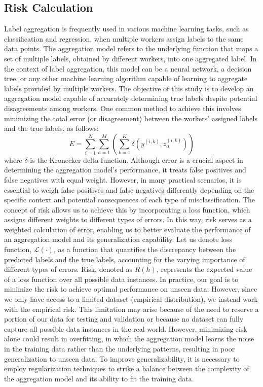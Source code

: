 \subsection{Risk Calculation}
Label aggregation is frequently used in various machine learning tasks, such as classification and regression, when multiple workers assign labels to the same data points. The aggregation model refers to the underlying function that maps a set of multiple labels, obtained by different workers, into one aggregated label. In the context of label aggregation, this model can be a neural network, a decision tree, or any other machine learning algorithm capable of learning to aggregate labels provided by multiple workers. The objective of this study is to develop an aggregation model capable of accurately determining true labels despite potential disagreements among workers. One common method to achieve this involves minimizing the total error (or disagreement) between the workers' assigned labels and the true labels, as follows:
\begin{equation}
E = \sum_{i=1}^N \sum_{a=1}^M \left( \sum_{k=1}^K \delta\left(y^{(i,k)}, z_\alpha^{(i,k)}\right) \right)
\label{eq:crowd.Eq.1.risk.error}
\end{equation}
where $\delta $ is the Kronecker delta function.
Although error is a crucial aspect in determining the aggregation model's performance, it treats false positives and false negatives with equal weight. However, in many practical scenarios, it is essential to weigh false positives and false negatives differently depending on the specific context and potential consequences of each type of misclassification. The concept of risk allows us to achieve this by incorporating a loss function, which assigns different weights to different types of errors. In this way, risk serves as a weighted calculation of error, enabling us to better evaluate the performance of an aggregation model and its generalization capability.
Let us denote loss function, $\mathcal{L}(\cdot)$, as a function that quantifies the discrepancy between the predicted labels and the true labels, accounting for the varying importance of different types of errors.
Risk, denoted as $R(h) $, represents the expected value of a loss function over all possible data instances.  In practice, our goal is to minimize the risk to achieve optimal performance on unseen data. However, since we only have access to a limited dataset (empirical distribution), we instead work with the empirical risk. This limitation may arise because of the need to reserve a portion of our data for testing and validation or because no dataset can fully capture all possible data instances in the real world. However, minimizing risk alone could result in overfitting, in which the aggregation model learns the noise in the training data rather than the underlying patterns, resulting in poor generalization to unseen data. To improve generalizability, it is necessary to employ regularization techniques to strike a balance between the complexity of the aggregation model and its ability to fit the training data.
